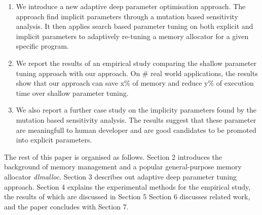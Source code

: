 \begin{enumerate}

\item We introduce a new adaptive deep parameter optimisation approach. The approach find implicit parameters through a mutation based sensitivity analysis. It then applies search based parameter tuning on both explicit and implicit parameters to adaptively re-tuning a memory allocator for a given specific program.

\item We report the results of an empirical study comparing the shallow parameter tuning approach with our approach. On \# real world applications, the results show that our approach can save x\% of memory and reduce y\% of execution time over shallow parameter tuning. 

\item We also report a further case study on the implicity parameters found by the mutation based sensitivity analysis. The results suggest that these parameter are meaningfull to human developer and are good candidates to be promoted into explicit parameters. 
\end{enumerate}

The rest of this paper is organised as follows. 
Section 2 introduces the background of memory management and a popular general-purpose memory allocator \emph{dlmalloc}.
Section 3 describes out adaptive deep parameter tuning approach.
Section 4 explains the experimental methods for the empirical study, the results of which are discussed in Section 5
Section 6 discusses related work, and the paper concludes with Section 7.


